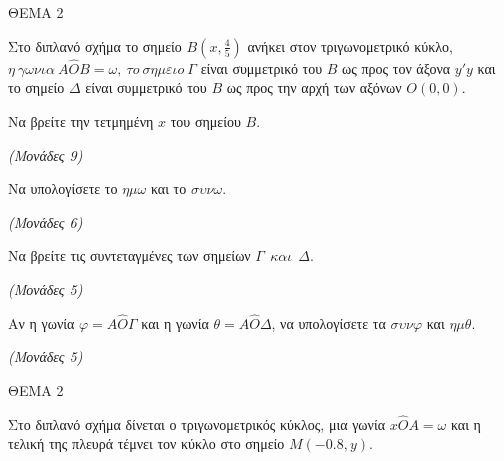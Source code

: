 \documentclass[11pt,a4paper,twoside]{book}
\newcommand{\monades}[1]{\hfill \textit{(Μονάδες #1)}}
\begin{document}
ΘΕΜΑ 2

Στο διπλανό σχήμα το σημείο $B\left(x, \frac{4}{5}\right)$ ανήκει στον τριγωνομετρικό κύκλο, $\eta\ \gamma\omega\nu\iota\alpha\ A\widehat{O}B = \omega,\ \tau o\ \sigma\eta\mu\varepsilon\iota o\ \Gamma$ είναι συμμετρικό του $B$ ως προς τον άξονα $y'y$ και το σημείο $\Delta$ είναι συμμετρικό του $B$ ως προς την αρχή των αξόνων $Ο(0,0)$.

\begin{alist}
\item Να βρείτε την τετμημένη $x$ του σημείου $B$.

\monades{9}

\item Να υπολογίσετε το $\eta\mu\omega$ και το $\sigma\upsilon\nu\omega$.

\monades{6}

\item Να βρείτε τις συντεταγμένες των σημείων $\Gamma\ \ \kappa\alpha\iota\ \ \Delta$.

\monades{5}

\item Αν η γωνία $\varphi = A\widehat{O}\Gamma$ και η γωνία $\theta = A\widehat{O}\Delta$, να υπολογίσετε τα $\sigma\upsilon\nu\varphi$ και $\eta\mu\theta$.

\monades{5}
\end{alist}

\vspace{4mm}

ΘΕΜΑ 2

Στο διπλανό σχήμα δίνεται ο τριγωνομετρικός κύκλος, μια γωνία $x\widehat{O}A = \omega$ και η τελική της πλευρά τέμνει τον κύκλο στο σημείο $Μ(-0.8, y)$.
\end{document}
